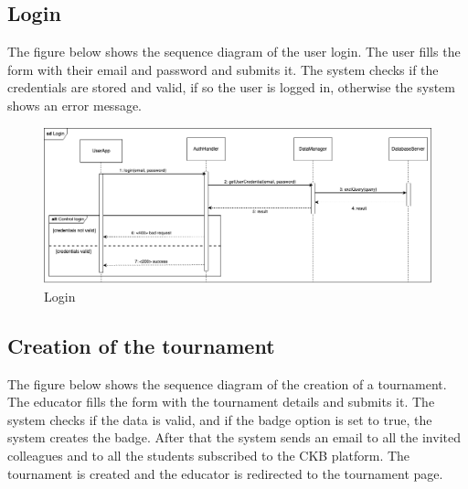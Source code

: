 \subsection{Login}
The figure below shows the sequence diagram of the user login. The user fills the form with their email and password and submits it. 
The system checks if the credentials are stored and valid, if so the user is logged in, otherwise the system shows an error message.\\
\begin{figure}[H]
    \centering
    \includegraphics[width=1\textwidth]{images/seq_diagrams/Login_DD.png}
    \caption{Login}
\end{figure}
\clearpage

\subsection{Creation of the tournament}
The figure below shows the sequence diagram of the creation of a tournament. The educator fills the form
 with the tournament details and submits it. The system checks if the data is valid, and if the badge option is set to true, the system creates the badge.
 After that the system sends an email to all the invited colleagues and to all the students subscribed to the CKB platform. 
 The tournament is created and the educator is redirected to the tournament page.\\

